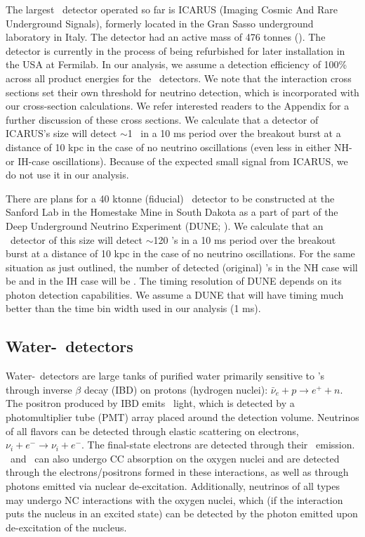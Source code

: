 The largest \ detector operated so far is ICARUS (Imaging 
Cosmic And Rare Underground Signals), formerly located in the Gran Sasso 
underground laboratory in Italy.  The detector had an active mass of
476 tonnes (\citealt{rubbiaetal2011}).  The detector is currently in
the process of being refurbished for later installation in the USA 
at Fermilab.  
In our analysis, we assume a detection efficiency
of 100\% across all product energies for the \ detectors. 
We note that the interaction cross sections set their own
threshold for neutrino detection, which is incorporated with our
cross-section 
calculations.  We refer interested readers to the Appendix for
a further discussion of these cross sections.  
We calculate that a detector of ICARUS's size 
will detect $\sim$1 \nue\ in a 10 ms period over the
breakout burst at a distance of 10 kpc in the case of no neutrino
oscillations (even less in either NH- or IH-case oscillations). 
Because of the expected small
signal from ICARUS, we do not use it in our analysis.

There are plans for a 40 ktonne (fiducial) \ detector to be
constructed at the Sanford Lab in the
Homestake Mine in South Dakota as a part of
part of the Deep Underground Neutrino Experiment    
 (DUNE; \citealt{deoliviera2015}).  We calculate that an \ detector of
this size will detect $\sim$120 \nue's in a 10 ms period over the
breakout burst at a distance of 10 kpc in the case of no neutrino
oscillations.  For the same situation as just outlined, the number of
detected (original) \nue's in the NH case will be  and in the IH
case will be . The timing resolution of DUNE depends on its 
photon detection capabilities. We assume a DUNE that will have 
timing much better than the time bin width used in our analysis (1 ms).



\subsection{Water-\cer\ detectors}
Water-\cer\ detectors are large tanks of purified water
primarily sensitive to \anue's through inverse $\beta$ decay (IBD) on
protons (hydrogen nuclei): $\bar\nu_e + p \rightarrow e^+ + n$. 
The positron produced by IBD emits \cer\ light, which is detected by
a photomultiplier tube (PMT) array placed around the detection
volume. Neutrinos of all flavors can be detected through elastic
scattering on electrons, $\nu_i + e^- \rightarrow \nu_i + e^-$.  
The final-state electrons are detected through their
\cer\ emission.  \nue\ and \anue\ can also undergo CC absorption 
on the oxygen
nuclei  and are detected through the electrons/positrons formed in
these interactions, as well as through photons emitted via nuclear
de-excitation.  
Additionally, neutrinos of all types may undergo NC
interactions with the oxygen nuclei, which (if the interaction puts
the nucleus in an excited state) can be detected by the photon emitted
upon de-excitation of the nucleus.

